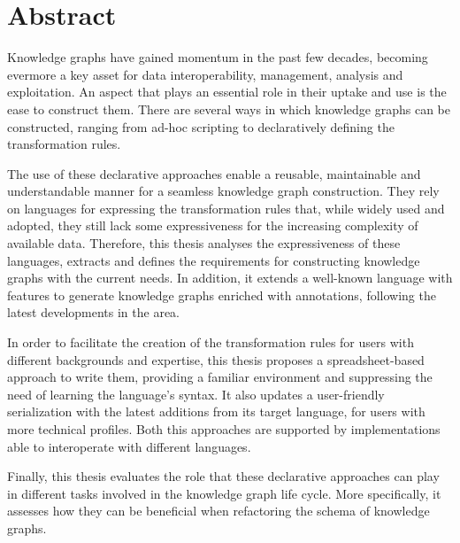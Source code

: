 %

\section*{Abstract}
\label{sec::abstract}




Knowledge graphs have gained momentum in the past few decades, becoming evermore a key asset for data interoperability, management, analysis and exploitation. 
An aspect that plays an essential role in their uptake and use is the ease to construct them. 
There are several ways in which knowledge graphs can be constructed, ranging from ad-hoc scripting to  declaratively defining the transformation rules.

The use of these declarative approaches enable a reusable, maintainable and understandable manner for a seamless knowledge graph construction.
They rely on languages for expressing the transformation rules that, while widely used and adopted, they still lack some expressiveness for the increasing complexity of available data. 
Therefore, this thesis analyses the expressiveness of these languages, extracts and defines the requirements for constructing knowledge graphs with the current needs. 
In addition, it extends a well-known language with features to generate knowledge graphs enriched with annotations, following the latest developments in the area.

In order to facilitate the creation of the transformation rules for users with different backgrounds and expertise, this thesis proposes a spreadsheet-based approach to write them, providing a familiar environment and suppressing the need of learning the language's syntax.
It also updates a user-friendly serialization with the latest additions from its target language, for users with more technical profiles. 
Both this approaches are supported by implementations able to interoperate with different languages. 

Finally, this thesis evaluates the role that these declarative approaches can play in different tasks involved in the knowledge graph life cycle. 
More specifically, it assesses how they can be beneficial when refactoring the schema of knowledge graphs. 

